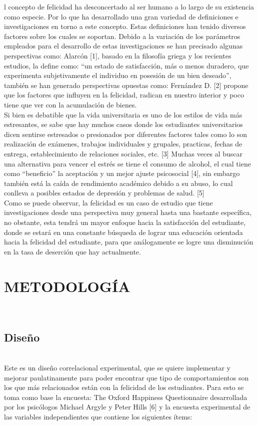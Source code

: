 \documentclass[conference]{IEEEtran}
\begin{document}
l concepto de felicidad ha desconcertado al ser humano a lo largo de su existencia como especie. Por lo que ha desarrollado una gran variedad de definiciones e investigaciones en torno a este concepto. Estas definiciones han tenido diversos factores sobre los cuales se soportan. Debido a la variación de los parámetros empleados para el desarrollo de estas investigaciones se han precisado algunas perspectivas como: Alarcón [1], basado en la filosofía griega y los recientes estudios, la define como: “un estado de satisfacción, más o menos duradero, que experimenta subjetivamente el individuo en posesión de un bien deseado”, también se han generado perspectivas opuestas como: Fernández D. [2] propone que los factores que influyen en la felicidad, radican en nuestro interior y poco tiene que ver con la acumulación de bienes.\\

   Si bien es debatible que la vida universitaria es uno de los estilos de vida más estresantes, se sabe que hay muchos casos donde los estudiantes universitarios dicen sentirse estresados o presionados por diferentes factores tales como lo son realización de exámenes, trabajos individuales y grupales, practicas, fechas de entrega, establecimiento de relaciones sociales, etc. [3] Muchas veces al buscar una alternativa para vencer el estrés se tiene el consumo de alcohol, el cual tiene como “beneficio” la aceptación y un mejor ajuste psicosocial [4], sin embargo también está la caída de rendimiento académico debido a su abuso, lo cual conlleva a posibles estados de depresión y problemas de salud. [5]\\

   Como se puede observar, la felicidad es un caso de estudio que tiene investigaciones desde una perspectiva muy general hasta una bastante específica, no obstante, esta tendrá un mayor enfoque hacia la satisfacción del estudiante, donde se estará en una constante búsqueda de lograr una educación orientada hacia la felicidad del estudiante, para que análogamente se logre una disminución en la tasa de deserción que hay actualmente.\\



\section{METODOLOGÍA}\\
\subsection{Diseño}\\
   Este es un diseño correlacional experimental, que se quiere implementar y mejorar paulatinamente para poder encontrar que tipo de comportamientos son los que más relacionados están con la felicidad de los estudiantes. Para esto se toma como base la encuesta: The Oxford Happiness Questionnaire desarrollada por los psicólogos Michael Argyle y Peter Hills [6] y la encuesta experimental de las variables independientes que contiene los siguientes ítems:\\
   
\end{document}
